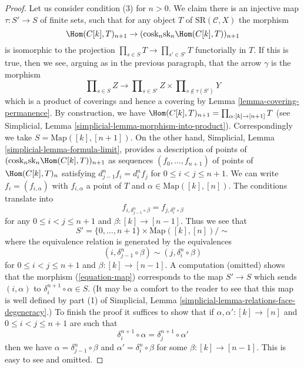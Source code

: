 \begin{proof}
\medskip\noindent
Let us consider condition (3) for $n > 0$. We claim there is an
injective map $\tau : S' \to S$ of finite sets, such that for any
object $T$ of $\text{SR}(\mathcal{C}, X)$ the morphism
\begin{equation}
\label{equation-map}
\Hom(C[k], T)_{n + 1} \to
(\text{cosk}_n \text{sk}_n \Hom(C[k], T))_{n + 1}
\end{equation}
is isomorphic to the projection $\prod_{s \in S} T \to \prod_{s' \in S'} T$
functorially in $T$. If this is true, then we see, arguing as in the previous
paragraph, that the arrow $\gamma$ is the morphism
$$
\prod\nolimits_{s \in S} Z
\longrightarrow
\prod\nolimits_{s \in S'} Z
\times
\prod\nolimits_{s \not\in \tau(S')} Y
$$
which is a product of coverings and hence a covering by
Lemma \ref{lemma-covering-permanence}. By construction, we have
$\Hom(C[k], T)_{n + 1} = \prod_{\alpha : [k] \to [n + 1]} T$
(see Simplicial, Lemma \ref{simplicial-lemma-morphism-into-product}).
Correspondingly we take $S = \text{Map}([k], [n + 1])$.
On the other hand, Simplicial, Lemma \ref{simplicial-lemma-formula-limit},
provides a description of points of
$(\text{cosk}_n \text{sk}_n \Hom(C[k], T))_{n + 1}$
as sequences $(f_0, \ldots, f_{n + 1})$ of points of $\Hom(C[k], T)_n$
satisfying $d^n_{j - 1} f_i = d^n_i f_j$ for $0 \leq i < j \leq n + 1$.
We can write $f_i = (f_{i, \alpha})$ with $f_{i, \alpha}$ a point of $T$
and $\alpha \in \text{Map}([k], [n])$. The conditions translate into
$$
f_{i, \delta^n_{j - 1} \circ \beta} = f_{j, \delta_i^n \circ \beta}
$$
for any $0 \leq i < j \leq n + 1$ and $\beta : [k] \to [n - 1]$. Thus we
see that
$$
S' = \{0, \ldots, n + 1\} \times \text{Map}([k], [n]) / \sim
$$
where the equivalence relation is generated by the equivalences
$$
(i, \delta^n_{j - 1} \circ \beta) \sim (j, \delta_i^n \circ \beta)
$$
for $0 \leq i < j \leq n + 1$ and $\beta : [k] \to [n - 1]$.
A computation (omitted) shows that the morphism (\ref{equation-map})
corresponds to the map $S' \to S$ which sends $(i, \alpha)$ to
$\delta^{n + 1}_i \circ \alpha \in S$. (It may be a comfort to the
reader to see that this map is well defined by part (1) of
Simplicial, Lemma \ref{simplicial-lemma-relations-face-degeneracy}.)
To finish the proof it suffices to show that if
$\alpha, \alpha' : [k] \to [n]$ and $0 \leq i < j \leq n + 1$
are such that
$$
\delta^{n + 1}_i \circ \alpha = \delta^{n + 1}_j \circ \alpha'
$$
then we have $\alpha = \delta^n_{j - 1} \circ \beta$
and $\alpha' = \delta_i^n \circ \beta$ for some $\beta : [k] \to [n - 1]$.
This is easy to see and omitted.
\end{proof}

